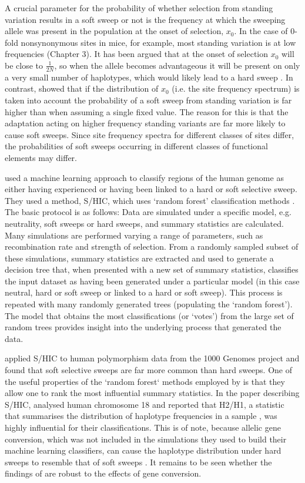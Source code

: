 	A crucial parameter for the probability of whether selection from standing variation results in a soft sweep or not is the frequency at which the sweeping allele was present in the population at the onset of selection, $x_0$. In the case of 0-fold nonsynonymous sites in mice, for example,  most standing variation is at low frequencies (Chapter 3). It has been argued that at the onset of selection $x_0$ will be close to $\frac{1}{2N}$, so when the allele becomes advantageous it will be present on only a very small number of haplotypes, which would likely lead to a hard sweep \citep{RN153}. In contrast, \cite{RN336} showed that if the distribution of $x_0$ (i.e. the site frequency spectrum) is taken into account the probability of a soft sweep from standing variation is far higher than when assuming a single fixed value. The reason for this is that the adaptation acting on higher frequency standing variants are far more likely to cause soft sweeps. Since site frequency spectra for different classes of sites differ, the probabilities of soft sweeps occurring in different classes of functional elements may differ. 

	\cite{RN338} used a machine learning approach to classify regions of the human genome as either having experienced or having been linked to a hard or soft selective sweep. They used a method, S/HIC, which uses `random forest' classification methods \citep{RN337}. The basic protocol is as follows: Data are simulated under a specific model, e.g. neutrality, soft sweeps or hard sweeps, and summary statistics are calculated. Many simulations are performed varying a range of parameters, such as recombination rate and strength of selection. From a randomly sampled subset of these simulations, summary statistics are extracted and used to generate a decision tree that, when presented with a new set of summary statistics, classifies the input dataset as having been generated under a particular model (in this case neutral, hard or soft sweep or linked to a hard or soft sweep). This process is repeated with many randomly generated trees (populating the `random forest'). The model that obtains the most classifications (or `votes') from the large set of random trees provides insight into the underlying process that generated the data. 
	
	\cite{RN338} applied S/HIC to human polymorphism data from the 1000 Genomes project \citep{RN272} and found that soft selective sweeps are far more common than hard sweeps. One of the useful properties of the `random forest` methods employed by \cite{RN338} is that they allow one to rank the most influential summary statistics. In the paper describing S/HIC, \cite{RN337} analysed human chromosome 18 and reported that H2/H1, a statistic that summarises the distribution of haplotype frequencies in a sample \citep{RN208}, was highly influential for their classifications. This is of note, because allelic gene conversion, which was not included in the simulations they used to build their machine learning classifiers, can cause the haplotype distribution under hard sweeps to resemble that of soft sweeps \citep{RN366}. It remains to be seen whether the findings of \cite{RN338} are robust to the effects of gene conversion.
	
